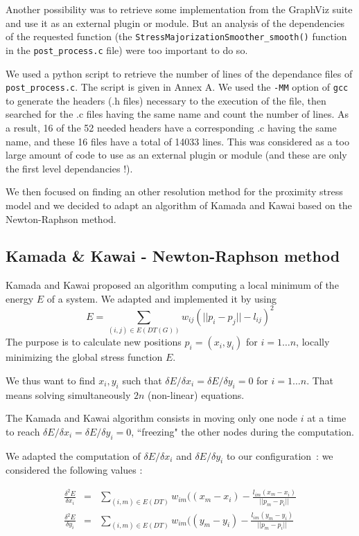 \documentclass[12pt]{report}
\begin{document}
\bigskip
Another possibility was to retrieve some implementation from the GraphViz suite and use it as an external plugin or module. 
But an analysis of the dependencies of the requested function (the \texttt{StressMajorizationSmoother\_smooth()} function in the \texttt{post\_process.c} file) were too important to do so.

We used a python script to retrieve the number of lines of the dependance files of \texttt{post\_process.c}. The script is given in Annex A. We used the \texttt{-MM} option of \texttt{gcc} to generate the headers (.h files) necessary to the execution of the file, then searched for the .c files having the same name and count the number of lines. As a result, 16 of the 52 needed headers have a corresponding .c having the same name, and these 16 files have a total of 14033 lines.
This was considered as a too large amount of code to use as an external plugin or module (and these are only the first level dependancies !).

\bigskip
We then focused on finding an other resolution method for the proximity stress model and we decided to adapt an algorithm of Kamada and Kawai based on the Newton-Raphson method.

\subsection{Kamada \& Kawai - Newton-Raphson method}

Kamada and Kawai \cite{Kamada89} proposed an algorithm computing a local minimum of the energy $E$ of a system. We adapted and implemented it by using 
\[ E = \sum_{(i,j) \in E(DT(G))} w_{ij}(||p_i - p_j|| - l_{ij})^2 \]
The purpose is to calculate new positions $p_i = (x_i, y_i)$ for $i = 1 \ldots n$, locally minimizing the global stress function $E$. 

We thus want to find $x_i, y_i$ such that $\delta E / \delta x_i = \delta E / \delta y_i = 0$ for $i = 1 \ldots n$. That means solving simultaneously $2n$ (non-linear) equations.

\bigskip
The Kamada and Kawai algorithm consists in moving only one node $i$ at a time to reach $\delta E / \delta x_i = \delta E / \delta y_i = 0$, ``freezing" the other nodes during the computation.

We adapted the computation of $\delta E / \delta x_i$ and $\delta E / \delta y_i$ to our configuration~: we considered the following values :

\begin{eqnarray*}
\frac{\delta^2 E}{\delta x_i}  & = & \sum_{(i,m) \in E(DT)} w_{im} ( (x_m - x_i) - \frac{l_{im} (x_m - x_i)}{||p_m - p_i||} \\
\frac{\delta^2 E}{\delta y_i}  & = & \sum_{(i,m) \in E(DT)} w_{im} ( (y_m - y_i) - \frac{l_{im} (y_m - y_i)}{||p_m - p_i||}
\end{eqnarray*}
 
\end{document}
